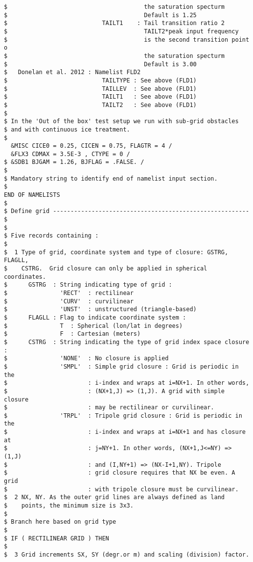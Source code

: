 \begin{footnotesize}
\begin{verbatim}
$                                       the saturation specturm
$                                       Default is 1.25
$                           TAILT1    : Tail transition ratio 2
$                                       TAILT2*peak input frequency
$                                       is the second transition point o
$                                       the saturation specturm
$                                       Default is 3.00
$   Donelan et al. 2012 : Namelist FLD2
$                           TAILTYPE : See above (FLD1)
$                           TAILLEV  : See above (FLD1)
$                           TAILT1   : See above (FLD1)
$                           TAILT2   : See above (FLD1)
$
$ In the 'Out of the box' test setup we run with sub-grid obstacles
$ and with continuous ice treatment.
$
  &MISC CICE0 = 0.25, CICEN = 0.75, FLAGTR = 4 /
  &FLX3 CDMAX = 3.5E-3 , CTYPE = 0 /
$ &SDB1 BJGAM = 1.26, BJFLAG = .FALSE. /
$
$ Mandatory string to identify end of namelist input section.
$
END OF NAMELISTS
$
$ Define grid -------------------------------------------------------- $
$
$ Five records containing :
$
$  1 Type of grid, coordinate system and type of closure: GSTRG, FLAGLL,
$    CSTRG.  Grid closure can only be applied in spherical coordinates.
$      GSTRG  : String indicating type of grid :
$               'RECT'  : rectilinear
$               'CURV'  : curvilinear  
$               'UNST'  : unstructured (triangle-based)
$      FLAGLL : Flag to indicate coordinate system :
$               T  : Spherical (lon/lat in degrees)
$               F  : Cartesian (meters)
$      CSTRG  : String indicating the type of grid index space closure :
$               'NONE'  : No closure is applied
$               'SMPL'  : Simple grid closure : Grid is periodic in the
$                       : i-index and wraps at i=NX+1. In other words,
$                       : (NX+1,J) => (1,J). A grid with simple closure
$                       : may be rectilinear or curvilinear.
$               'TRPL'  : Tripole grid closure : Grid is periodic in the
$                       : i-index and wraps at i=NX+1 and has closure at
$                       : j=NY+1. In other words, (NX+1,J<=NY) => (1,J)
$                       : and (I,NY+1) => (NX-I+1,NY). Tripole
$                       : grid closure requires that NX be even. A grid
$                       : with tripole closure must be curvilinear.
$  2 NX, NY. As the outer grid lines are always defined as land
$    points, the minimum size is 3x3.
$
$ Branch here based on grid type
$
$ IF ( RECTILINEAR GRID ) THEN
$
$  3 Grid increments SX, SY (degr.or m) and scaling (division) factor.

\end{verbatim}
\end{footnotesize}
